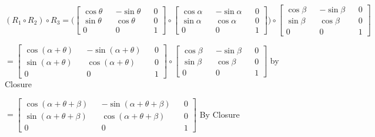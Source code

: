 \documentclass{article}
\begin{document}
\begin{enumerate}
        $(R_1 \circ R_2) \circ R_3 = \Bigg (\begin{bmatrix}
            \cos \theta && - \sin \theta && 0 \\ 
            \sin \theta && \cos \theta && 0 \\
            0  && 0  && 1 
        \end{bmatrix} \circ
        \begin{bmatrix}
            \cos \alpha && - \sin \alpha && 0  \\ 
            \sin \alpha && \cos \alpha && 0 \\
            0  && 0  && 1
        \end{bmatrix} \Bigg ) \circ \begin{bmatrix}
            \cos \beta && - \sin \beta && 0  \\ 
            \sin \beta && \cos \beta && 0 \\
            0  && 0  && 1
        \end{bmatrix}$

        $ =\begin{bmatrix}
            \cos (\alpha + \theta)  && - \sin (\alpha + \theta) && 0 \\ 
            \sin (\alpha + \theta) && \cos (\alpha + \theta) && 0  \\
            0  && 0  && 1 
        \end{bmatrix} \circ \begin{bmatrix}
            \cos \beta && - \sin \beta && 0  \\ 
            \sin \beta && \cos \beta && 0 \\
            0  && 0  && 1
        \end{bmatrix}$ by Closure

        $=\begin{bmatrix}
            \cos (\alpha + \theta + \beta)  && - \sin (\alpha + \theta + \beta) && 0 \\ 
            \sin (\alpha + \theta + \beta) && \cos (\alpha + \theta + \beta) && 0  \\
            0  && 0  && 1 
        \end{bmatrix}$ By Closure



\end{enumerate}
\end{document}
